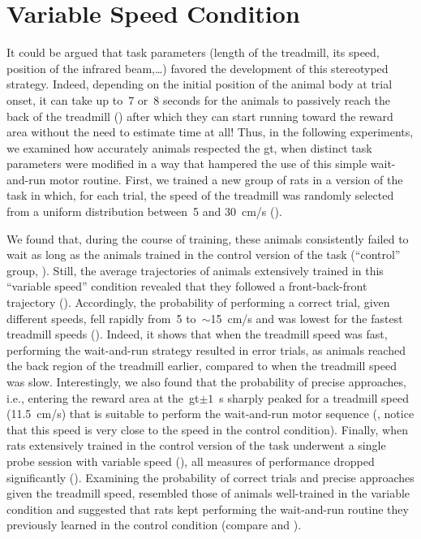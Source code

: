 \section{Variable Speed Condition}
\label{ch:time:varSpeed}

It could be argued that task parameters (length of the treadmill, its speed, position of the infrared beam,\dots) favored the development of this stereotyped strategy.
Indeed, depending on the initial position of the animal body at trial onset, it can take up to~7 or~8 seconds for the animals to passively reach the back of the treadmill () after which they can start running toward the reward area without the need to estimate time at all!
Thus, in the following experiments, we examined how accurately animals respected the \gls{gt}, when distinct task parameters were modified in a way that hampered the use of this simple wait-and-run motor routine.
First, we trained a new group of rats in a version of the task in which, for each trial, the speed of the treadmill was randomly selected from a uniform distribution between~5 and 30~cm/s ().

We found that, during the course of training, these animals consistently failed to wait as long as the animals trained in the control version of the task (``control'' group, ).
Still, the average trajectories of animals extensively trained in this ``variable speed'' condition revealed that they followed a front-back-front trajectory ().
Accordingly, the probability of performing a correct trial, given different speeds, fell rapidly from~5 to~$\sim$15~cm/s and was lowest for the fastest treadmill speeds ().
Indeed, it shows that when the treadmill speed was fast, performing the wait-and-run strategy resulted in error trials, as animals reached the back region of the treadmill earlier, compared to when the treadmill speed was slow.
Interestingly, we also found that the probability of precise approaches, i.e., entering the reward area at the~\gls{gt}$\pm 1$~s sharply peaked for a treadmill speed (11.5~cm/s) that is suitable to perform the wait-and-run motor sequence (, notice that this speed is very close to the speed in the control condition).
Finally, when rats extensively trained in the control version of the task underwent a single probe session with variable speed (), all measures of performance dropped significantly ().
Examining the probability of correct trials and precise approaches given the treadmill speed, resembled those of animals well-trained in the variable condition and suggested that rats kept performing the wait-and-run routine they previously learned in the control condition (compare  and ).


